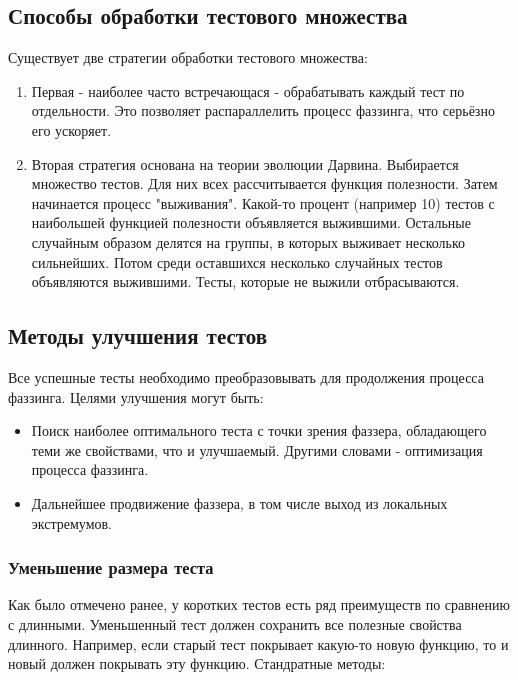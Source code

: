 \documentclass[a4paper]{article}
\begin{document}
\subsection{Способы обработки тестового множества}
\indent

Существует две стратегии обработки тестового множества:

\begin{enumerate}
\item Первая - наиболее часто встречающася - обрабатывать каждый тест по отдельности. Это позволяет распараллелить процесс фаззинга, что серьёзно его ускоряет. 
\item Вторая стратегия основана на теории эволюции Дарвина. Выбирается множество тестов. Для них всех рассчитывается функция полезности. Затем начинается процесс "выживания". Какой-то процент (например 10) тестов с наибольшей функцией полезности объявляется выжившими. Остальные случайным образом делятся на группы, в которых выживает несколько сильнейших. Потом среди оставшихся несколько случайных тестов объявляются выжившими. Тесты, которые не выжили отбрасываются.
\end{enumerate}

\subsection{Методы улучшения тестов}
\indent

Все успешные тесты необходимо преобразовывать для продолжения процесса фаззинга. Целями улучшения могут быть: 
\begin{itemize}
\item Поиск наиболее оптимального теста с точки зрения фаззера, обладающего теми же свойствами, что и улучшаемый. Другими словами - оптимизация процесса фаззинга.
\item Дальнейшее продвижение фаззера, в том числе выход из локальных экстремумов.
\end{itemize}

\subsubsection{Уменьшение размера теста}
\indent

Как было отмечено ранее, у коротких тестов есть ряд преимуществ по сравнению с длинными. Уменьшенный тест должен сохранить все полезные свойства длинного. Например, если старый тест покрывает какую-то новую функцию, то и новый должен покрывать эту функцию. Стандратные методы:
\end{document}
